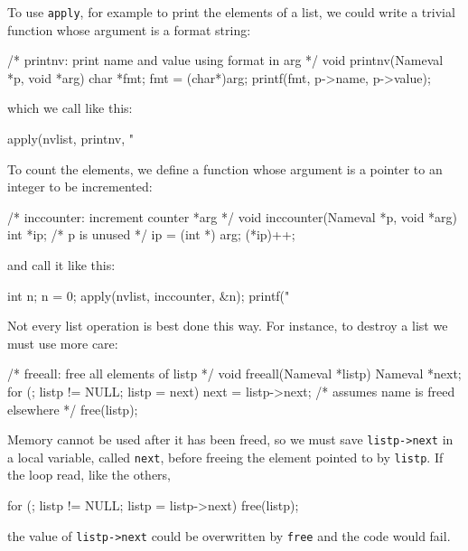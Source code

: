 To use \verb'apply', for example to print the elements of a list, we could
write a trivial function whose argument is a format string:
\begin{wellcode}
    /* printnv: print name and value using format in arg */
    void printnv(Nameval *p, void *arg)
    {
        char *fmt;
        fmt = (char*)arg;
        printf(fmt, p->name, p->value);
    }
\end{wellcode}
which we call like this:
\begin{wellcode}
    apply(nvlist, printnv, "%
\end{wellcode}
To count the elements, we define a function whose argument is a pointer to
an integer to be incremented:
\begin{wellcode}
    /* inccounter: increment counter *arg */
    void inccounter(Nameval *p, void *arg)
    {
        int *ip;
        /* p is unused */
        ip = (int *) arg;
        (*ip)++;
    }
\end{wellcode}
and call it like this:
\begin{wellcode}
    int n;
    n = 0;
    apply(nvlist, inccounter, &n);
    printf("%
\end{wellcode}

Not every list operation is best done this way. For instance, to destroy a
list we must use more care:
\begin{wellcode}
    /* freeall: free all elements of listp */
    void freeall(Nameval *listp)
    {
        Nameval *next;
        for (; listp != NULL; listp = next) {
            next = listp->next;
            /* assumes name is freed elsewhere */
            free(listp);
        }
    }
\end{wellcode}
Memory cannot be used after it has been freed, so we must save
\verb'listp->next' in a local variable, called \verb'next', before freeing
the element pointed to by \verb'listp'. If the loop read, like the others,
\begin{badcode}
    for (; listp != NULL; listp = listp->next)
        free(listp);
\end{badcode}
the value of \verb'listp->next' could be overwritten by \verb'free' and the
code would fail.

